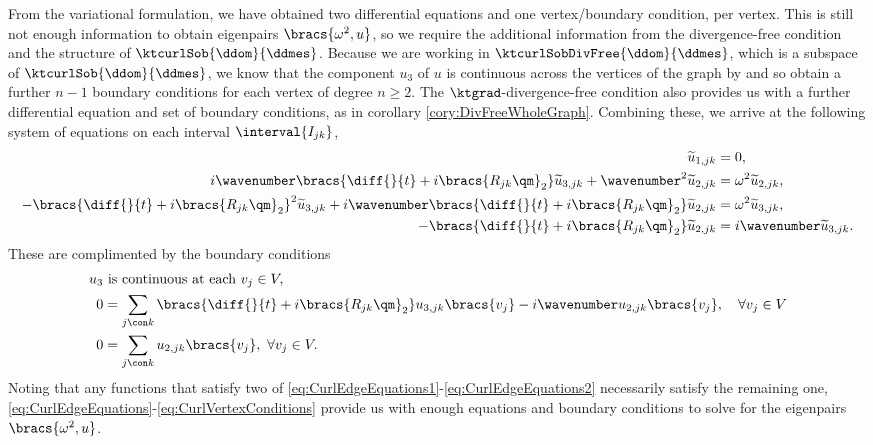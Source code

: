 From the variational formulation, we have obtained two differential equations and one vertex/boundary condition, per vertex.
This is still not enough information to obtain eigenpairs $\bracs{\omega^2, u}$, so we require the additional information from the divergence-free condition and the structure of $\ktcurlSob{\ddom}{\ddmes}$.
Because we are working in $\ktcurlSobDivFree{\ddom}{\ddmes}$, which is a subspace of $\ktcurlSob{\ddom}{\ddmes}$, we know that the component $u_3$ of $u$ is continuous across the vertices of the graph by  and so obtain a further $n-1$ boundary conditions for each vertex of degree $n\geq2$.
The $\ktgrad$-divergence-free condition also provides us with a further differential equation and set of boundary conditions, as in corollary \ref{cory:DivFreeWholeGraph}.
Combining these, we arrive at the following system of equations on each interval $\interval{I_{jk}}$,
\begin{subequations} \label{eq:CurlEdgeEquations}
	\begin{align}
		\widetilde{u}_{1,jk} &= 0, \\
		i\wavenumber\bracs{\diff{}{t} + i\bracs{R_{jk}\qm}_2}\widetilde{u}_{3,jk} + \wavenumber^2\widetilde{u}_{2,jk} &= \omega^2 \widetilde{u}_{2,jk}, \label{eq:CurlEdgeEquations1} \\
		-\bracs{\diff{}{t} + i\bracs{R_{jk}\qm}_2}^2\widetilde{u}_{3,jk} + i\wavenumber\bracs{\diff{}{t} + i\bracs{R_{jk}\qm}_2}\widetilde{u}_{2,jk} &= \omega^2\widetilde{u}_{3,jk}, \label{eq:CurlEdgeEquations2} \\
		-\bracs{\diff{}{t} + i\bracs{R_{jk}\qm}_2}\widetilde{u}_{2,jk} &= i\wavenumber\widetilde{u}_{3,jk}. \label{eq:CurlEdgeEquations3}
	\end{align}
\end{subequations}
These are complimented by the boundary conditions
\begin{subequations} \label{eq:CurlVertexConditions}
	\begin{align}
		u_3 &\text{ is continuous at each } v_j\in V, \label{eq:CurlVertexConditionsCty}\\
		0 &= \sum_{j\con k} \bracs{\diff{}{t} + i\bracs{R_{jk}\qm}_2}u_{3,jk}\bracs{v_j} - i\wavenumber u_{2,jk}\bracs{v_j}, \quad\forall v_j\in V \label{eq:CurlVertexConditionsSumDeriv}\\
		0 &= \sum_{j\con k}u_{2,jk}\bracs{v_j}, \ \forall v_j\in V. \label{eq:CurlVertexConditionsSum2}
	\end{align}
\end{subequations}
Noting that any functions that satisfy two of \eqref{eq:CurlEdgeEquations1}-\eqref{eq:CurlEdgeEquations2} necessarily satisfy the remaining one, \eqref{eq:CurlEdgeEquations}-\eqref{eq:CurlVertexConditions} provide us with enough equations and boundary conditions to solve for the eigenpairs $\bracs{\omega^2, u}$.

